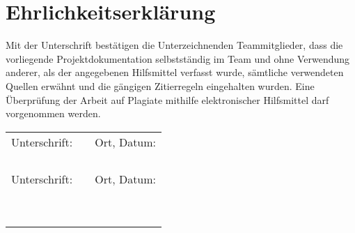 \section{Ehrlichkeitserklärung}\label{sec:Ehrlichkeitserklärung}
Mit der Unterschrift bestätigen die Unterzeichnenden Teammitglieder, dass die vorliegende Projektdokumentation selbstständig im Team und ohne Verwendung anderer, als der angegebenen Hilfsmittel verfasst wurde, sämtliche verwendeten Quellen erwähnt und die gängigen Zitierregeln eingehalten wurden. Eine Überprüfung der Arbeit auf Plagiate mithilfe elektronischer Hilfsmittel darf vorgenommen werden.


\vspace{20mm}


\begin{center}
		\renewcommand{\arraystretch}{1}
	\begin{tabular}{lp{5em}l} 
  
		
		Unterschrift:   && Ort, Datum: \\
		&&\\
		\hspace{5cm}   && \hspace{5cm} \\\cline{1-1}\cline{3-3}
		&&\\
		&&\\
		Unterschrift:   && Ort, Datum: \\
		&&\\
		\hspace{5cm}   && \hspace{5cm} \\\cline{1-1}\cline{3-3}
		&&\\
		&&\\

  
  \ \\
 \end{tabular}
 \end{center}





